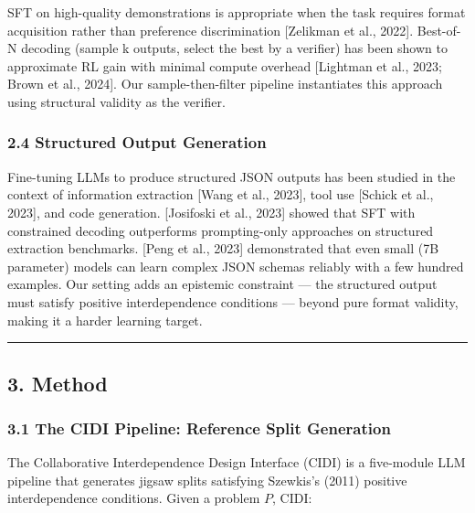 \documentclass[
  11pt,
]{article}
\begin{document}
SFT on high-quality demonstrations is appropriate when the task requires
format acquisition rather than preference discrimination [Zelikman et al., 2022]. Best-of-N decoding (sample k outputs, select
the best by a verifier) has been shown to approximate RL gain with
minimal compute overhead [Lightman et al., 2023; Brown et al., 2024]. Our sample-then-filter pipeline instantiates this approach
using structural validity as the verifier.

\subsubsection{2.4 Structured Output
Generation}\label{structured-output-generation}

Fine-tuning LLMs to produce structured JSON outputs has been studied in
the context of information extraction [Wang et al., 2023], tool
use [Schick et al., 2023], and code generation. [Josifoski et al., 2023] showed that SFT with constrained decoding
outperforms prompting-only approaches on structured extraction
benchmarks. [Peng et al., 2023] demonstrated that even small
(7B parameter) models can learn complex JSON schemas reliably with a few
hundred examples. Our setting adds an epistemic constraint --- the
structured output must satisfy positive interdependence conditions ---
beyond pure format validity, making it a harder learning target.

\begin{center}\rule{0.5\linewidth}{0.5pt}\end{center}

\subsection{3. Method}\label{method}

\subsubsection{3.1 The CIDI Pipeline: Reference Split
Generation}\label{the-cidi-pipeline-reference-split-generation}

The Collaborative Interdependence Design Interface (CIDI) is a
five-module LLM pipeline that generates jigsaw splits satisfying
Szewkis's (2011) positive interdependence conditions. Given a problem
\(P\), CIDI:
\end{document}

